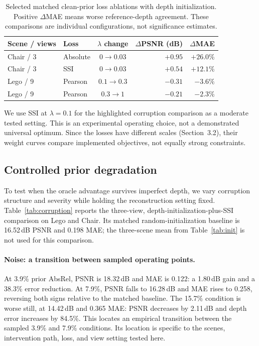 \documentclass[10pt,a4paper]{article}
\begin{document}
\begin{table}[!htbp]\centering\small
\caption{Selected matched clean-prior loss ablations with depth initialization.
Positive $\Delta$MAE means worse reference-depth agreement. These comparisons are
individual configurations, not significance estimates.}
\label{tab:lossablation}
\begin{tabular}{llcrr}
\toprule
Scene / views & Loss & $\lambda$ change & $\Delta$PSNR (dB) & $\Delta$MAE\\
\midrule
Chair / 3 & Absolute & $0\rightarrow0.03$ & $+0.95$ & $+26.0\%$\\
Chair / 3 & SSI & $0\rightarrow0.03$ & $+0.54$ & $+12.1\%$\\
Lego / 9 & Pearson & $0.1\rightarrow0.3$ & $-0.31$ & $-3.6\%$\\
Lego / 9 & Pearson & $0.3\rightarrow1$ & $-0.21$ & $-2.3\%$\\
\bottomrule
\end{tabular}
\end{table}

We use SSI at $\lambda=0.1$ for the highlighted corruption comparison as a moderate
tested setting. This is an experimental operating choice, not a demonstrated
universal optimum. Since the losses have different scales (Section~3.2), their weight
curves compare implemented objectives, not equally strong constraints.

\subsection{Controlled prior degradation}

To test when the oracle advantage survives imperfect depth, we vary corruption
structure and severity while holding the reconstruction setting fixed.
Table~\ref{tab:corruption} reports the three-view, depth-initialization-plus-SSI
comparison on Lego and Chair. Its matched random-initialization baseline is 16.52\,dB
PSNR and 0.198 MAE; the three-scene mean from Table~\ref{tab:init} is not used for
this comparison.

\paragraph{Noise: a transition between sampled operating points.} At 3.9\% prior
AbsRel, PSNR is 18.32\,dB and MAE is 0.122: a 1.80\,dB gain and a 38.3\% error
reduction. At 7.9\%, PSNR falls to 16.28\,dB and MAE rises to 0.258, reversing both
signs relative to the matched baseline. The 15.7\% condition is worse still, at
14.42\,dB and 0.365 MAE: PSNR decreases by 2.11\,dB and depth error increases by
84.5\%. This locates an empirical transition between the sampled 3.9\% and 7.9\%
conditions. Its location is specific to the scenes, intervention path, loss, and view
setting tested here.
\end{document}
